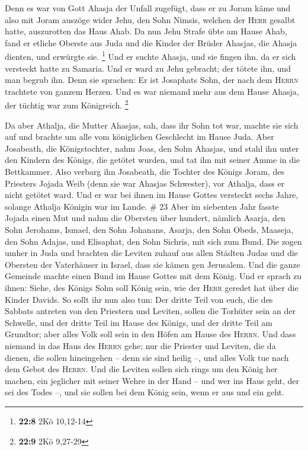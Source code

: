  Denn es war von Gott Ahasja der Unfall zugefügt, dass er
zu Joram käme und also mit Joram auszöge wider Jehu, den Sohn Nimsis,
welchen der \textsc{Herr} gesalbt hatte, auszurotten das Haus Ahab.
 Da nun Jehu Strafe übte am Hause Ahab, fand er etliche
Oberste aus Juda und die Kinder der Brüder Ahasjas, die Ahasja dienten,
und erwürgte sie. \footnote{\textbf{22:8} 2Kö 10,12-14} 
Und er suchte Ahasja, und sie fingen ihn, da er sich versteckt hatte zu
Samaria. Und er ward zu Jehu gebracht; der tötete ihn, und man begrub
ihn. Denn sie sprachen: Er ist Josaphats Sohn, der nach dem
\textsc{Herrn} trachtete von ganzem Herzen. Und es war niemand mehr aus
dem Hause Ahasja, der tüchtig war zum Königreich. \footnote{\textbf{22:9}
  2Kö 9,27-29}

 Da aber Athalja, die Mutter Ahasjas, sah, dass ihr Sohn
tot war, machte sie sich auf und brachte um alle vom königlichen
Geschlecht im Hause Juda.  Aber Josabeath, die
Königstochter, nahm Joas, den Sohn Ahasjas, und stahl ihn unter den
Kindern des Königs, die getötet wurden, und tat ihn mit seiner Amme in
die Bettkammer. Also verbarg ihn Josabeath, die Tochter des Königs
Joram, des Priesters Jojada Weib (denn sie war Ahasjas Schwester), vor
Athalja, dass er nicht getötet ward.  Und er war bei
ihnen im Hause Gottes versteckt sechs Jahre, solange Athalja Königin war
im Lande. \# 23  Aber im siebenten Jahr fasste Jojada
einen Mut und nahm die Obersten über hundert, nämlich Asarja, den Sohn
Jerohams, Ismael, den Sohn Johanans, Asarja, den Sohn Obeds, Maaseja,
den Sohn Adajas, und Elisaphat, den Sohn Sichris, mit sich zum Bund.
 Die zogen umher in Juda und brachten die Leviten zuhauf
aus allen Städten Judas und die Obersten der Vaterhäuser in Israel, dass
sie kämen gen Jerusalem.  Und die ganze Gemeinde machte
einen Bund im Hause Gottes mit dem König. Und er sprach zu ihnen: Siehe,
des Königs Sohn soll König sein, wie der \textsc{Herr} geredet hat über
die Kinder Davids.  So sollt ihr nun also tun: Der dritte
Teil von euch, die des Sabbats antreten von den Priestern und Leviten,
sollen die Torhüter sein an der Schwelle,  und der dritte
Teil im Hause des Königs, und der dritte Teil am Grundtor; aber alles
Volk soll sein in den Höfen am Hause des \textsc{Herrn}. 
Und dass niemand in das Haus des \textsc{Herrn} gehe; nur die Priester
und Leviten, die da dienen, die sollen hineingehen -- denn sie sind
heilig --, und alles Volk tue nach dem Gebot des \textsc{Herrn}.
 Und die Leviten sollen sich rings um den König her
machen, ein jeglicher mit seiner Wehre in der Hand -- und wer ins Haus
geht, der sei des Todes --, und sie sollen bei dem König sein, wenn er
aus und ein geht.

